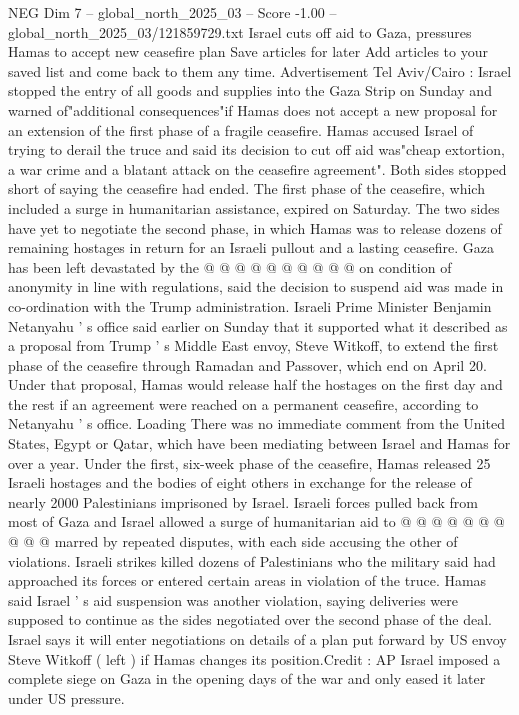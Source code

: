 \begin{textsample}{NEG Dim 7 – global\_north\_2025\_03 – Score -1.00 – global\_north\_2025\_03/121859729.txt}  \label{ex:f7_neg_134}
Israel cuts off aid to Gaza, pressures Hamas to accept new ceasefire plan Save articles for later Add articles to your saved list and come back to them any time.
Advertisement Tel Aviv/Cairo : Israel stopped the entry of all goods and supplies into the Gaza Strip on Sunday and warned of"additional consequences"if Hamas does not accept a new proposal for an extension of the first phase of a fragile ceasefire.
Hamas accused Israel of trying to derail the truce and said its decision to cut off aid was"cheap extortion, a war crime and a blatant attack on the ceasefire agreement".
Both sides stopped short of saying the ceasefire had ended.
The first phase of the ceasefire, which included a surge in humanitarian assistance, expired on Saturday.
The two sides have yet to negotiate the second phase, in which Hamas was to release dozens of remaining hostages in return for an Israeli pullout and a lasting ceasefire.
Gaza has been left devastated by the @ @ @ @ @ @ @ @ @ @ on condition of anonymity in line with regulations, said the decision to suspend aid was made in co-ordination with the Trump administration.
Israeli Prime Minister Benjamin Netanyahu ' s office said earlier on Sunday that it supported what it described as a proposal from Trump ' s Middle East envoy, Steve Witkoff, to extend the first phase of the ceasefire through Ramadan and Passover, which end on April 20.
Under that proposal, Hamas would release half the hostages on the first day and the rest if an agreement were reached on a permanent ceasefire, according to Netanyahu ' s office.
Loading There was no immediate comment from the United States, Egypt or Qatar, which have been mediating between Israel and Hamas for over a year.
Under the first, six-week phase of the ceasefire, Hamas released 25 Israeli hostages and the bodies of eight others in exchange for the release of nearly 2000 Palestinians imprisoned by Israel.
Israeli forces pulled back from most of Gaza and Israel allowed a surge of humanitarian aid to @ @ @ @ @ @ @ @ @ @ marred by repeated disputes, with each side accusing the other of violations.
Israeli strikes killed dozens of Palestinians who the military said had approached its forces or entered certain areas in violation of the truce.
Hamas said Israel ' s aid suspension was another violation, saying deliveries were supposed to continue as the sides negotiated over the second phase of the deal.
Israel says it will enter negotiations on details of a plan put forward by US envoy Steve Witkoff ( left ) if Hamas changes its position.Credit : AP Israel imposed a complete siege on Gaza in the opening days of the war and only eased it later under US pressure.

\end{textsample}
